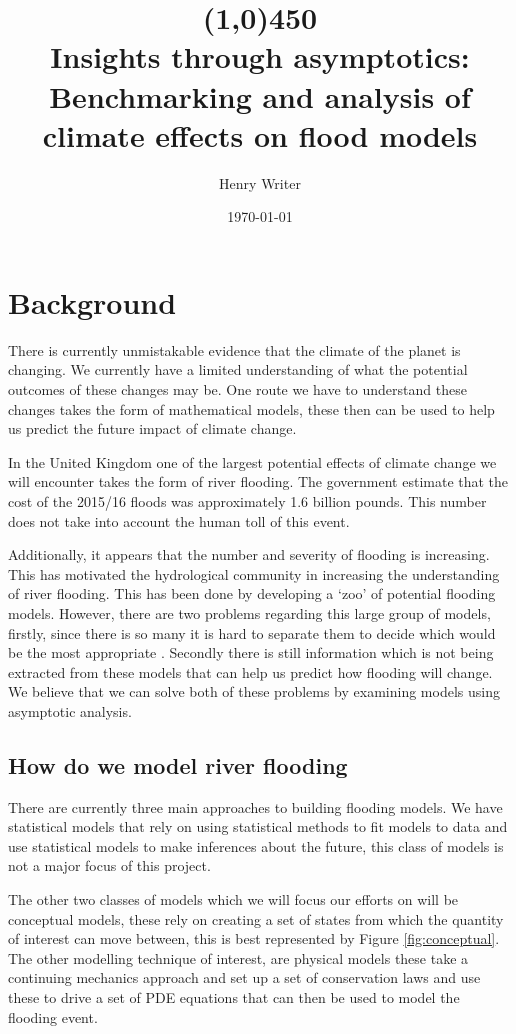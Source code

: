 \documentclass[11pt]{article}
\title{\line(1,0){450} \\ \Huge\textbf{Insights through asymptotics:}\\
 \LARGE Benchmarking and analysis of climate effects on flood models}
\author{Henry Writer }
\date{\monthyeardate\today}
\begin{document}
\maketitle

\section{Background}

There is currently unmistakable evidence that the climate of the planet is changing. We currently have a limited understanding of what the potential outcomes of these changes may be. One route we have to understand these changes takes the form of mathematical models, these then can be used to help us predict the future impact of climate change.

In the United Kingdom one of the largest potential effects of climate change we will encounter takes the form of river flooding. The government estimate that the cost of the 2015/16 floods was approximately 1.6 billion pounds. This number does not take into account the human toll of this event. 


Additionally, it appears that the number and severity of flooding is increasing. This has motivated the hydrological community in increasing the understanding of river flooding. This has been done by developing a `zoo' of potential flooding models. However, there are two problems regarding this large group of models, firstly, since there is so many it is hard to separate them to decide which would be the most appropriate \cite{neelz2013benchmarking}. 
Secondly there is still information which is not being extracted from these models that can help us predict how flooding will change. We believe that we can solve both of these problems by examining models using asymptotic analysis.


\subsection{How do we model river flooding}
There are currently three main approaches to building flooding models. We have statistical models that rely on using statistical methods to fit models to data and use statistical models to make inferences about the future, this class of models is not a major focus of this project. 

The other two classes of models which we will focus our efforts on will be conceptual models, these rely on creating a set of states from which the quantity of interest can move between, this is best represented by Figure \ref{fig:conceptual}. 
The other modelling technique of interest, are physical models these take a continuing mechanics approach and set up a set of conservation laws and use these to drive a set of PDE equations that can then be used to model the flooding event.
\end{document}
